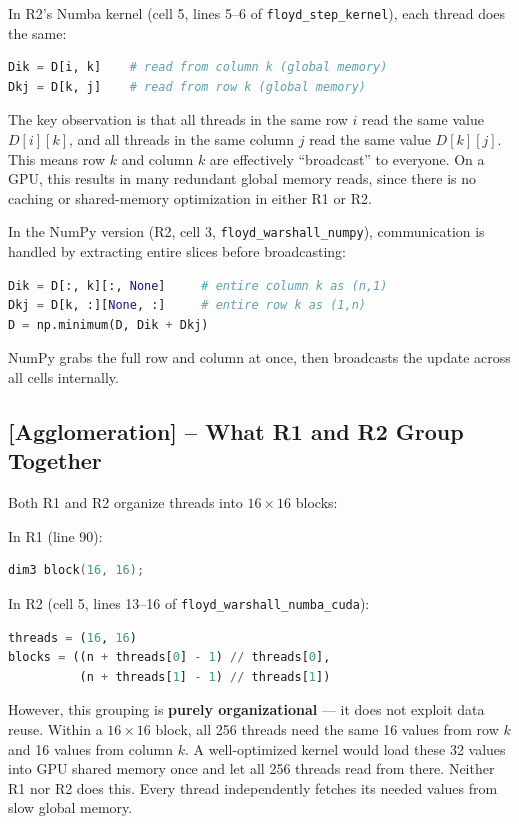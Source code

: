 \documentclass[11pt]{article}
\begin{document}
In R2's Numba kernel (cell 5, lines 5--6 of \texttt{floyd\_step\_kernel}), each thread does the same:
\begin{lstlisting}[language=Python]
Dik = D[i, k]    # read from column k (global memory)
Dkj = D[k, j]    # read from row k (global memory)
\end{lstlisting}

The key observation is that all threads in the same row $i$ read the same value $D[i][k]$, and all threads in the same column $j$ read the same value $D[k][j]$. This means row $k$ and column $k$ are effectively ``broadcast'' to everyone. On a GPU, this results in many redundant global memory reads, since there is no caching or shared-memory optimization in either R1 or R2.

In the NumPy version (R2, cell 3, \texttt{floyd\_warshall\_numpy}), communication is handled by extracting entire slices before broadcasting:
\begin{lstlisting}[language=Python]
Dik = D[:, k][:, None]     # entire column k as (n,1)
Dkj = D[k, :][None, :]     # entire row k as (1,n)
D = np.minimum(D, Dik + Dkj)
\end{lstlisting}
NumPy grabs the full row and column at once, then broadcasts the update across all cells internally.

\subsection*{[Agglomeration] -- What R1 and R2 Group Together}

Both R1 and R2 organize threads into $16 \times 16$ blocks:

In R1 (line 90):
\begin{lstlisting}[language=C++]
dim3 block(16, 16);
\end{lstlisting}

In R2 (cell 5, lines 13--16 of \texttt{floyd\_warshall\_numba\_cuda}):
\begin{lstlisting}[language=Python]
threads = (16, 16)
blocks = ((n + threads[0] - 1) // threads[0],
          (n + threads[1] - 1) // threads[1])
\end{lstlisting}

However, this grouping is \textbf{purely organizational} --- it does not exploit data reuse. Within a $16 \times 16$ block, all 256 threads need the same 16 values from row $k$ and 16 values from column $k$. A well-optimized kernel would load these 32 values into GPU shared memory once and let all 256 threads read from there. Neither R1 nor R2 does this. Every thread independently fetches its needed values from slow global memory.
\end{document}
